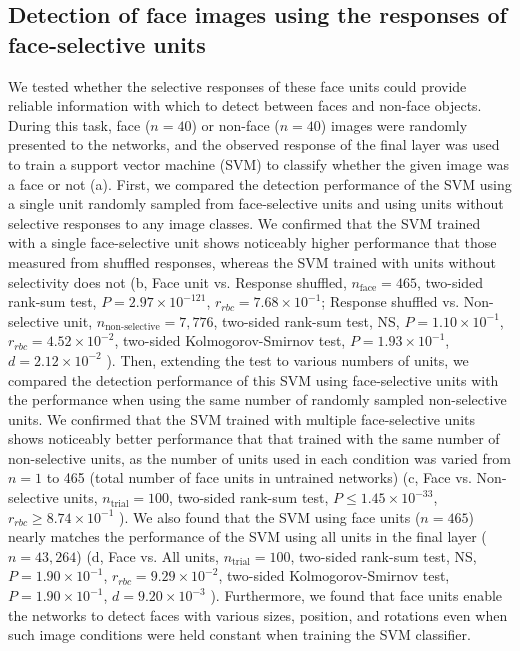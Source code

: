 \documentclass[sn-mathphys]{sn-jnl}%
\theoremstyle{thmstyleone}%
\theoremstyle{thmstyletwo}%
\theoremstyle{thmstylethree}%
\begin{document}
\subsection{Detection of face images using the responses of face-selective units}
We tested whether the selective responses of these face units could provide reliable information with which to detect between faces and non-face objects.
During this task, face ($ n=40 $) or non-face ($ n=40 $) images were randomly presented to the networks, and the observed response of the final layer was used to train a support vector machine (SVM) to classify whether the given image was a face or not (a).
First, we compared the detection performance of the SVM using a single unit randomly sampled from face-selective units and using units without selective responses to any image classes.
We confirmed that the SVM trained with a single face-selective unit shows noticeably higher performance that those measured from shuffled responses, whereas the SVM trained with units without selectivity does not 
(b,
Face unit vs. Response shuffled, 
$ n_\textrm{face} = 465 $,
two-sided rank-sum test,
$ P = 2.97 \times 10 ^{-121} $,
$ r_{rbc} = 7.68 \times 10^{-1} $;
Response shuffled vs. Non-selective unit, 
$ n_\textrm{non-selective} = 7,776 $,
two-sided rank-sum test, NS, 
$ P = 1.10 \times 10^{-1} $,
$ r_{rbc} = 4.52 \times 10^{-2} $,
two-sided Kolmogorov-Smirnov test,
$ P = 1.93 \times 10^{-1} $,
$ d = 2.12 \times 10^{-2} $
).
Then, extending the test to various numbers of units, we compared the detection performance of this SVM using face-selective units with the performance when using the same number of randomly sampled non-selective units.
We confirmed that the SVM trained with multiple face-selective units shows noticeably better performance that that trained with the same number of non-selective units, 
as the number of units used in each condition was varied from $ n=1 $ to 465 (total number of face units in untrained networks)
(c,
Face vs. Non-selective units, 
$ n_\textrm{trial} = 100 $,
two-sided rank-sum test, 
$ P \leq 1.45 \times 10^{-33} $,
$ r_{rbc} \geq 8.74 \times 10^{-1} $
).
We also found that the SVM using face units ($ n=465 $) nearly matches the performance of the SVM using all units in the final layer ($ n=43,264 $)
(d, 
Face vs. All units, 
$ n_\textrm{trial} = 100 $,
two-sided rank-sum test, NS, 
$ P = 1.90 \times 10^{-1} $,
$ r_{rbc} = 9.29 \times 10^{-2} $,
two-sided Kolmogorov-Smirnov test,
$ P = 1.90 \times 10^{-1} $,
$ d = 9.20 \times 10^{-3} $
).
Furthermore, we found that face units enable the networks to detect faces with various sizes, position, and rotations even when such image conditions were held constant when training the SVM classifier.
\end{document}
